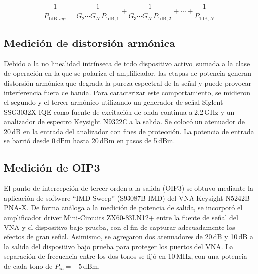 \begin{equation}
\frac{1}{P_{\text{1dB},sys}} = \frac{1}{G_2 \cdots G_N \, P_{\text{1dB},1}} + \frac{1}{G_3 \cdots G_N \, P_{\text{1dB},2}} + \cdots + \frac{1}{P_{\text{1dB},N}}
\label{eq:p1db_cascada}
\end{equation}

\subsection{Medición de distorsión armónica}
Debido a la no linealidad intrínseca de todo dispositivo activo, sumada a la clase de operación en la que se polariza el amplificador, las etapas de potencia generan distorsión armónica que degrada la pureza espectral de la señal y puede provocar interferencia fuera de banda. Para caracterizar este comportamiento, se midieron el segundo y el tercer armónico utilizando un generador de señal Siglent SSG3032X-IQE como fuente de excitación de onda continua a 2,2\,GHz y un analizador de espectro Keysight N9322C a la salida. Se colocó un atenuador de 20\,dB en la entrada del analizador con fines de protección. La potencia de entrada se barrió desde 0\,dBm hasta 20\,dBm en pasos de 5\,dBm.

\subsection{Medición de OIP3}
El punto de intercepción de tercer orden a la salida (OIP3) se obtuvo mediante la aplicación de software ``IMD Sweep'' (S93087B IMD) del VNA Keysight N5242B PNA-X. De forma análoga a la medición de potencia de salida, se incorporó el amplificador driver Mini-Circuits ZX60-83LN12+ entre la fuente de señal del VNA y el dispositivo bajo prueba, con el fin de capturar adecuadamente los efectos de gran señal. Asimismo, se agregaron dos atenuadores de 20\,dB y 10\,dB a la salida del dispositivo bajo prueba para proteger los puertos del VNA. La separación de frecuencia entre los dos tonos se fijó en 10\,MHz, con una potencia de cada tono de $P_{in} = -5\,\text{dBm}$.